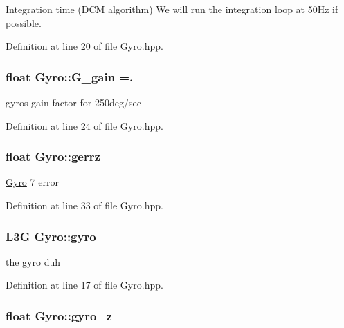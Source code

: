 Integration time (D\-C\-M algorithm) We will run the integration loop at 50\-Hz if possible. 



Definition at line 20 of file Gyro.\-hpp.

\hypertarget{classGyro_a47a4402067b812740622d729478ec1be}{
\subsubsection[{G\-\_\-gain}]{\setlength{\rightskip}{0pt plus 5cm}float Gyro\-::\-G\-\_\-gain =.\hspace{0.3cm}{\ttfamily [private]}}}\label{classGyro_a47a4402067b812740622d729478ec1be}


gyros gain factor for 250deg/sec 



Definition at line 24 of file Gyro.\-hpp.

\hypertarget{classGyro_aa725b8e8f7f7ae066c28ae67bcb310d6}{
\subsubsection[{gerrz}]{\setlength{\rightskip}{0pt plus 5cm}float Gyro\-::gerrz\hspace{0.3cm}{\ttfamily [private]}}}\label{classGyro_aa725b8e8f7f7ae066c28ae67bcb310d6}
\hyperlink{classGyro}{Gyro} 7 error 

Definition at line 33 of file Gyro.\-hpp.

\hypertarget{classGyro_ab449066006f8cdd13efcefc3542c6130}{
\subsubsection[{gyro}]{\setlength{\rightskip}{0pt plus 5cm}L3\-G Gyro\-::gyro\hspace{0.3cm}{\ttfamily [private]}}}\label{classGyro_ab449066006f8cdd13efcefc3542c6130}


the gyro duh 



Definition at line 17 of file Gyro.\-hpp.

\hypertarget{classGyro_af158408e03992ce3d5fc020d22a0f2a9}{
\subsubsection[{gyro\-\_\-z}]{\setlength{\rightskip}{0pt plus 5cm}float Gyro\-::gyro\-\_\-z\hspace{0.3cm}{\ttfamily [private]}}}\label{classGyro_af158408e03992ce3d5fc020d22a0f2a9}


